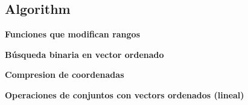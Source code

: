 \subsection{Algorithm}
    \textbf{Funciones que modifican rangos}
    

    \textbf{Búsqueda binaria en vector ordenado}
    
    
    \textbf{Compresion de coordenadas}
    

    \textbf{Operaciones de conjuntos con vectors ordenados (lineal)}
    
    